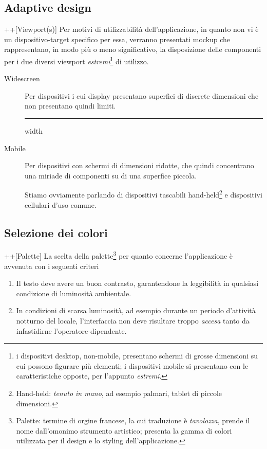 \subsection*{Adaptive design}+\Materialrotateright+[Viewport(s)]
Per motivi di utilizzabilità dell'applicazione, in quanto non vi è un dispositivo-target
specifico per essa, verranno presentati mockup che rappresentano, in modo più o meno significativo,
la disposizione delle componenti per i due diversi viewport \textit{estremi}\footnote{i dispositivi desktop, 
non-mobile, presentano schermi di grosse dimensioni su cui possono figurare più elementi; i dispositivi
mobile si presentano con le caratteristiche opposte, per l'appunto \textit{estremi}.} di utilizzo.
\begin{description}
	\item[Widescreen] Per dispositivi i cui display presentano superfici di discrete dimensioni
		che non presentano quindi limiti.
	\begingroup\color{ddchaptercolor}\vspace{6pt}\hrule height 0.6pt depth 0pt width \textwidth\relax\vspace{6pt}\endgroup
	\item[Mobile] Per dispositivi con schermi di dimensioni ridotte, che quindi concentrano
		una miriade di componenti su di una superfice piccola.
		\par\vspace{3mm}
		Stiamo ovviamente parlando di dispositivi tascabili hand-held\footnote{Hand-held: \textit{tenuto in mano},
		ad esempio palmari, tablet di piccole dimensioni.} e dispositivi cellulari d'uso comune.
\end{description}

\subsection*{Selezione dei colori}+\Materialcolorlens+[Palette]
La scelta della palette\footnote{Palette: termine di orgine francese, la cui traduzione è \textit{tavolozza}, prende
il nome dall'omonimo strumento artistico; presenta la gamma di colori utilizzata per il design e lo styling dell'applicazione.} 
per quanto concerne l'applicazione è avvenuta con i seguenti criteri
\begin{enumerate}
	\item Il testo deve avere un buon contrasto, garantendone la leggibilità in qualsiasi condizione
		di luminosità ambientale.
	\item In condizioni di scarsa luminosità, ad esempio durante un periodo d'attività notturno
		del locale, l'interfaccia non deve risultare troppo \textit{accesa} tanto da infastidirne
		l'operatore-dipendente.
\end{enumerate}

